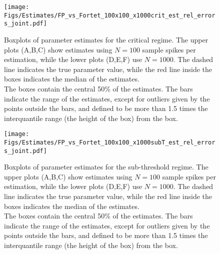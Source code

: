 \begin{figure}[p]
\begin{center}
\texttt{[image: Figs/Estimates/FP\_vs\_Fortet\_100x100\_x1000crit\_est\_rel\_errors\_joint.pdf]}
\caption[Estimates box-plots for critical regime]{Boxplots of parameter
estimates for the critical regime.
The upper plots (A,B,C) show estimates using $N=100$ sample spikes per
estimation, while the lower plots (D,E,F) use $N=1000$. The dashed line
indicates the true parameter value, while the red line inside the boxes
indicates the median of the estimates.
\\
The boxes contain the central 50\% of the estimates. The bars indicate
the range of the estimates, except for outliers given by the points
outside the bars, and defined to be more than 1.5 times the
interquantile range (the height of the box) from the box.}  
\label{fig:comprehensive_test_crit_relerrors}
\end{center}    
\end{figure} 
\begin{figure}[p]  
\begin{center}
\texttt{[image: Figs/Estimates/FP\_vs\_Fortet\_100x100\_x1000subT\_est\_rel\_errors\_joint.pdf]}
\caption[Estimates box-plots for sub-threshold regime]{Boxplots of parameter
estimates for the sub-threshold regime.
The upper plots (A,B,C) show estimates using $N=100$ sample spikes per
estimation, while the lower plots (D,E,F) use $N=1000$. The dashed line
indicates the true parameter value, while the red line inside the boxes
indicates the median of the estimates.
\\
The boxes contain the central 50\% of the estimates. The bars indicate
the range of the estimates, except for outliers given by the points
outside the bars, and defined to be more than 1.5 times the
interquantile range (the height of the box) from the box.}
\label{fig:comprehensive_test_SubT_relerrors}
\end{center}
\end{figure}
